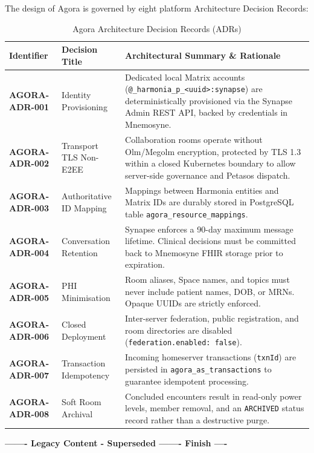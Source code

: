 The design of Agora is governed by eight platform Architecture Decision Records:

\begin{table}[htbp]
\centering
\small
\caption{Agora Architecture Decision Records (ADRs)}
\label{tab:agora_adrs}
\begin{tabularx}{\textwidth}{lP{3.5cm}Y}
\toprule
\textbf{Identifier} & \textbf{Decision Title} & \textbf{Architectural Summary \& Rationale} \\
\midrule
\textbf{AGORA-ADR-001} & Identity Provisioning & Dedicated local Matrix accounts (\nolinkurl{@_harmonia_p_<uuid>:synapse}) are deterministically provisioned via the Synapse Admin REST API, backed by credentials in Mnemosyne. \\
\textbf{AGORA-ADR-002} & Transport TLS Non-E2EE & Collaboration rooms operate without Olm/Megolm encryption, protected by TLS 1.3 within a closed Kubernetes boundary to allow server-side governance and Petasos dispatch. \\
\textbf{AGORA-ADR-003} & Authoritative ID Mapping & Mappings between Harmonia entities and Matrix IDs are durably stored in PostgreSQL table \nolinkurl{agora_resource_mappings}. \\
\textbf{AGORA-ADR-004} & Conversation Retention & Synapse enforces a 90-day maximum message lifetime. Clinical decisions must be committed back to Mnemosyne FHIR storage prior to expiration. \\
\textbf{AGORA-ADR-005} & PHI Minimisation & Room aliases, Space names, and topics must never include patient names, DOB, or MRNs. Opaque UUIDs are strictly enforced. \\
\textbf{AGORA-ADR-006} & Closed Deployment & Inter-server federation, public registration, and room directories are disabled (\nolinkurl{federation.enabled: false}). \\
\textbf{AGORA-ADR-007} & Transaction Idempotency & Incoming homeserver transactions (\nolinkurl{txnId}) are persisted in \nolinkurl{agora_as_transactions} to guarantee idempotent processing. \\
\textbf{AGORA-ADR-008} & Soft Room Archival & Concluded encounters result in read-only power levels, member removal, and an \nolinkurl{ARCHIVED} status record rather than a destructive purge. \\
\bottomrule
\end{tabularx}
\end{table}


\par\noindent\textbf{------- Legacy Content - Superseded ------- Finish ----}


